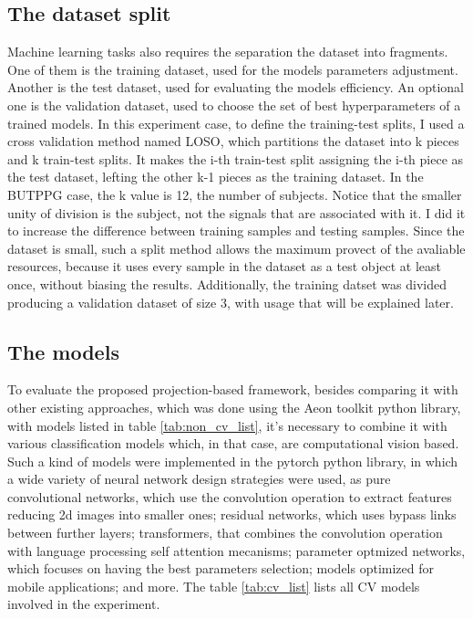 \subsection{The dataset split}

Machine learning tasks also requires the separation the dataset into fragments. One of them is the training dataset, used for the models parameters adjustment. Another is the test dataset, used for evaluating the models efficiency. An optional one is the validation dataset, used to choose the set of best hyperparameters of a trained models. In this experiment case, to define the training-test splits, I used a cross validation method named \acrfull{LOSO}, which partitions the dataset into k pieces and k train-test splits. It makes the i-th train-test split assigning the i-th piece as the test dataset, lefting the other k-1 pieces as the training dataset. In the \acrshort{BUTPPG} case, the k value is 12, the number of subjects. Notice that the smaller unity of division is the subject, not the signals that are associated with it. I did it to increase the difference between training samples and testing samples. Since the dataset is small, such a split method allows the maximum provect of the avaliable resources, because it uses every sample in the dataset as a test object at least once, without biasing the results. Additionally, the training datset was divided producing a validation dataset of size 3, with usage that will be explained later.

\subsection{The models}

To evaluate the proposed projection-based framework, besides comparing it with other existing approaches, which was done using the Aeon toolkit python library, with models listed in table \ref{tab:non_cv_list}, it's necessary to combine it with various classification models which, in that case, are computational vision based. Such a kind of models were implemented in the pytorch python library, in which a wide variety of neural network design strategies were used, as pure convolutional networks, which use the convolution operation to extract features reducing 2d images into smaller ones; residual networks, which uses bypass links between further layers; transformers, that combines the convolution operation with language processing self attention mecanisms; parameter optmized networks, which focuses on having the best parameters selection; models optimized for mobile applications; and more. The table \ref{tab:cv_list} lists all \acrshort{CV} models involved in the experiment.

